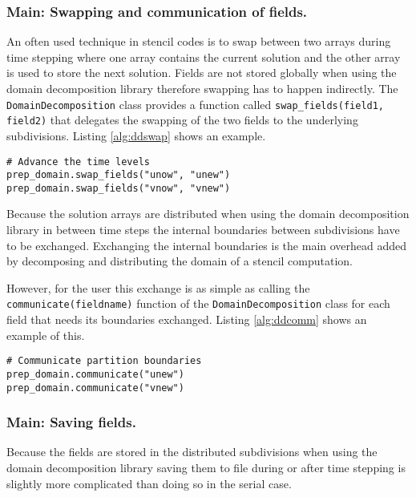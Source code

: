 \subsubsection{Main: Swapping and communication of fields.}
An often used technique in stencil codes is to swap between two arrays during time stepping where one array contains the current solution and the other array is used to store the next solution.
Fields are not stored globally when using the domain decomposition library therefore swapping has to happen indirectly.
The \texttt{DomainDecomposition} class provides a function called \texttt{swap\_fields(field1, field2)} that delegates the swapping of the two fields to the underlying subdivisions.
Listing \ref{alg:ddswap} shows an example.

\begin{lstlisting}[caption={Example swapping two arrays in the domain decomposition libarary},captionpos=b, label={alg:ddswap}]
# Advance the time levels
prep_domain.swap_fields("unow", "unew")
prep_domain.swap_fields("vnow", "vnew")
\end{lstlisting}

Because the solution arrays are distributed when using the domain decomposition library in between time steps the internal boundaries between subdivisions have to be exchanged.
Exchanging the internal boundaries is the main overhead added by decomposing and distributing the domain of a stencil computation.

However, for the user this exchange is as simple as calling the \texttt{communicate(fieldname)} function of the \texttt{DomainDecomposition} class for each field that needs its boundaries exchanged.
Listing \ref{alg:ddcomm} shows an example of this.

\begin{lstlisting}[caption={Example calling for internal boundary exchange of two fields in the domain decomposition libarary},captionpos=b, label={alg:ddcomm}]
# Communicate partition boundaries
prep_domain.communicate("unew")
prep_domain.communicate("vnew")
\end{lstlisting}

\subsubsection{Main: Saving fields.}
Because the fields are stored in the distributed subdivisions when using the domain decomposition library saving them to file during or after time stepping is slightly more complicated than doing so in the serial case.

